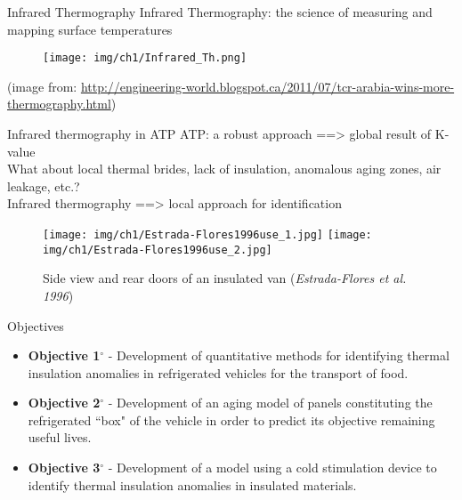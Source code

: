 \begin{frame}{Infrared Thermography}
    \footnotesize{Infrared Thermography: the science of measuring and mapping surface temperatures}
        \begin{figure}
            \texttt{[image: img/ch1/Infrared\_Th.png]}
        \end{figure}
        \scriptsize{(image from: \hyperlink{Engineering World}{http://engineering-world.blogspot.ca/2011/07/tcr-arabia-wins-more-thermography.html})}
\end{frame}



\begin{frame}{Infrared thermography in ATP}
\small
ATP: a robust approach ==> \alert{global} result of K-value\\
\pause
What about local thermal brides, lack of insulation, anomalous aging zones, air leakage, etc.?\\
\pause
Infrared thermography ==> \alert{local} approach for identification
\pause
    \begin{figure}
        \texttt{[image: img/ch1/Estrada-Flores1996use\_1.jpg]}
        \texttt{[image: img/ch1/Estrada-Flores1996use\_2.jpg]}
        \caption{Side view and rear doors of an insulated van (\textit{Estrada-Flores et al. 1996})}
    \end{figure}
\end{frame}


\begin{frame}{Objectives}
    \begin{itemize}
        \item \textbf{Objective 1$ ^\circ $ } - Development of quantitative methods for identifying thermal insulation anomalies in refrigerated vehicles for the transport of food.
        \item \textbf{Objective 2$ ^\circ $ } - Development of an aging model of panels constituting the refrigerated ``box" of the vehicle in order to predict its objective remaining useful lives. 
        \item \textbf{Objective 3$ ^\circ $ } - Development of a model using a cold stimulation device to identify thermal insulation anomalies in insulated materials.
    \end{itemize}
\end{frame}
